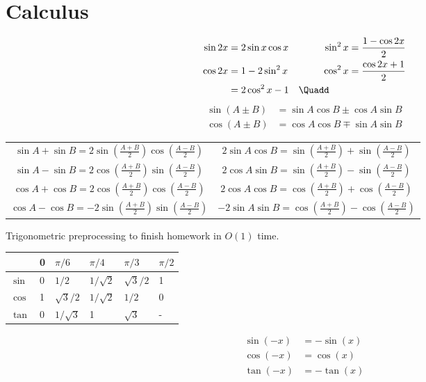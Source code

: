 \section{Calculus}\label{02c738a}

\label{c1fe42f}

\begin{alignat*}{3}
  \sin2x & =2\sin x\cos x & \sin^2x          & =\frac{1-\cos2x}2 \\
  \cos2x & =1-2\sin^2x    & \cos^2x          & =\frac{\cos2x+1}2 \\
         & =2\cos^2x-1    & \Quadd\quad\quad &
\end{alignat*}
\begin{align*}
  \sin(A\pm B) & =\sin A\cos B\pm\cos A\sin B \\
  \cos(A\pm B) & =\cos A\cos B\mp\sin A\sin B
\end{align*}
\begin{center}
  \renewcommand{\arraystretch}{1.5}
  \begin{tabular}{c|c}
    $\sin A+\sin B =2\sin(\frac{A+B}2)\cos(\frac{A-B}2)$  & $2\sin A\cos B=\sin(\frac{A+B}2)+\sin(\frac{A-B}2)$  \\
    $\sin A-\sin B =2\cos(\frac{A+B}2)\sin(\frac{A-B}2)$  & $2\cos A\sin B=\sin(\frac{A+B}2)-\sin(\frac{A-B}2)$  \\
    $\cos A+\cos B =2\cos(\frac{A+B}2)\cos(\frac{A-B}2)$  & $2\cos A\cos B=\cos(\frac{A+B}2)+\cos(\frac{A-B}2)$  \\
    $\cos A-\cos B =-2\sin(\frac{A+B}2)\sin(\frac{A-B}2)$ & $-2\sin A\sin B=\cos(\frac{A+B}2)-\cos(\frac{A-B}2)$
  \end{tabular}
\end{center}


Trigonometric preprocessing to finish homework in $O(1)$ time.

\begin{tabular}
  {|p{1cm}|p{1cm}|p{1cm}|p{1cm}|p{1cm}|p{1cm}|}
  \hline
         & 0 & $\pi/6$    & $\pi/4$    & $\pi/3$    & $\pi/2$ \\[0.2em]\hline
  $\sin$ & 0 & $1/2$      & $1/\sqrt2$ & $\sqrt3/2$ & 1       \\[0.2em]\hline
  $\cos$ & 1 & $\sqrt3/2$ & $1/\sqrt2$ & $1/2$      & 0       \\[0.2em]\hline
  $\tan$ & 0 & $1/\sqrt3$ & 1          & $\sqrt3$   & -       \\[0.2em]\hline
\end{tabular}
\begin{align*}
  \sin(-x) & =-\sin(x) \\
  \cos(-x) & =\cos(x)  \\
  \tan(-x) & =-\tan(x)  \\
\end{align*}

